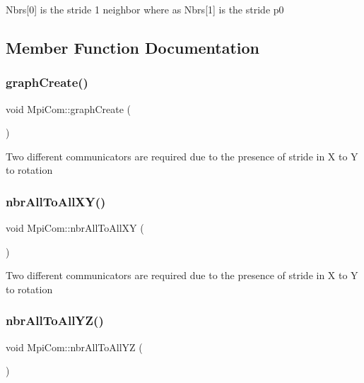 Nbrs\mbox{[}0\mbox{]} is the stride 1 neighbor where as Nbrs\mbox{[}1\mbox{]} is the stride p0 

\subsection{Member Function Documentation}
\mbox{\label{structMpiCom_a0e7f0633348f928e92f5bfe22f48a40d}} 
\subsubsection{\texorpdfstring{graph\+Create()}{graphCreate()}}
{\footnotesize\ttfamily void Mpi\+Com\+::graph\+Create (\begin{DoxyParamCaption}{ }\end{DoxyParamCaption})}

Two different communicators are required due to the presence of stride in X to Y to rotation \mbox{\label{structMpiCom_a19fa8f600a430ba4e5e3ea6f53deb649}} 
\subsubsection{\texorpdfstring{nbr\+All\+To\+All\+X\+Y()}{nbrAllToAllXY()}}
{\footnotesize\ttfamily void Mpi\+Com\+::nbr\+All\+To\+All\+XY (\begin{DoxyParamCaption}{ }\end{DoxyParamCaption})}

Two different communicators are required due to the presence of stride in X to Y to rotation \mbox{\label{structMpiCom_a003eaf50d2715dd49bfa1ef3e1d8c09a}} 
\subsubsection{\texorpdfstring{nbr\+All\+To\+All\+Y\+Z()}{nbrAllToAllYZ()}}
{\footnotesize\ttfamily void Mpi\+Com\+::nbr\+All\+To\+All\+YZ (\begin{DoxyParamCaption}{ }\end{DoxyParamCaption})}

